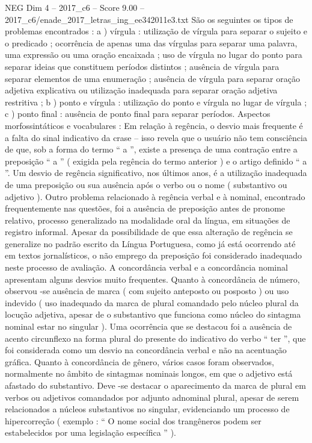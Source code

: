 \begin{textsample}{NEG Dim 4 – 2017\_c6 – Score 9.00 – 2017\_c6/enade\_2017\_letras\_ing\_ee342011e3.txt}
São os seguintes os tipos de problemas encontrados : a ) vírgula : utilização de vírgula para separar o sujeito e o predicado ; ocorrência de apenas uma das vírgulas para separar uma palavra, uma expressão ou uma oração encaixada ; uso de vírgula no lugar do ponto para separar ideias que constituem períodos distintos ; ausência de vírgula para separar elementos de uma enumeração ; ausência de vírgula para separar oração adjetiva explicativa ou utilização inadequada para separar oração adjetiva restritiva ; b ) ponto e vírgula : utilização do ponto e vírgula no lugar de vírgula ; c ) ponto final : ausência de ponto final para separar períodos.
Aspectos morfossintáticos e vocabulares : Em relação à regência, o desvio mais frequente é a falta do sinal indicativo da crase – isso revela que o usuário não tem consciência de que, sob a forma do termo “ a ”, existe a presença de uma contração entre a preposição “ a ” ( exigida pela regência do termo anterior ) e o artigo definido “ a ”.
Um desvio de regência significativo, nos últimos anos, é a utilização inadequada de uma preposição ou sua ausência após o verbo ou o nome ( substantivo ou adjetivo ).
Outro problema relacionado à regência verbal e à nominal, encontrado frequentemente nas questões, foi a ausência de preposição antes de pronome relativo, processo generalizado na modalidade oral da língua, em situações de registro informal.
Apesar da possibilidade de que essa alteração de regência se generalize no padrão escrito da Língua Portuguesa, como já está ocorrendo até em textos jornalísticos, o não emprego da preposição foi considerado inadequado neste processo de avaliação.
A concordância verbal e a concordância nominal apresentam alguns desvios muito frequentes.
Quanto à concordância de número, observou -se ausência de marca ( com sujeito anteposto ou posposto ) ou uso indevido ( uso inadequado da marca de plural comandado pelo núcleo plural da locução adjetiva, apesar de o substantivo que funciona como núcleo do sintagma nominal estar no singular ).
Uma ocorrência que se destacou foi a ausência de acento circunflexo na forma plural do presente do indicativo do verbo “ ter ”, que foi considerada como um desvio na concordância verbal e não na acentuação gráfica.
Quanto à concordância de gênero, vários casos foram observados, normalmente no âmbito de sintagmas nominais longos, em que o adjetivo está afastado do substantivo.
Deve -se destacar o aparecimento da marca de plural em verbos ou adjetivos comandados por adjunto adnominal plural, apesar de serem relacionados a núcleos substantivos no singular, evidenciando um processo de hipercorreção ( exemplo : “ O nome social dos trangêneros podem ser estabelecidos por uma legislação específica ” ).

\end{textsample}
